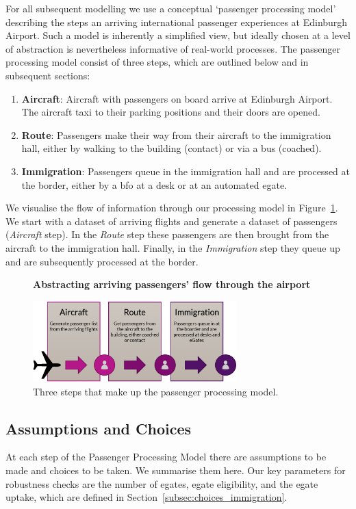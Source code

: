 \documentclass[10pt]{article}
\newcommand*{\figuretitle}[1]{%
    {\centering%
    \textbf{#1}%
    \par\medskip}%
}
\begin{document}
    For all subsequent modelling we use a conceptual `passenger processing model' describing the steps an arriving international passenger experiences at Edinburgh Airport. Such a model is inherently a simplified view, but ideally chosen at a level of abstraction is nevertheless informative of real-world processes. The passenger processing model consist of three steps, which are outlined below and in subsequent sections:
\begin{enumerate}
    \item \textbf{Aircraft}: Aircraft with passengers on board arrive at Edinburgh Airport. The aircraft taxi to their parking positions and their doors are opened. \label{step:aircraft}
    \item \textbf{Route}: Passengers make their way from their aircraft to the immigration hall, either by walking to the building (contact) or via a bus (coached). \label{step:route}
    \item \textbf{Immigration}: Passengers queue in the immigration hall and are processed at the border, either by a \gls{bfo} at a desk or at an automated \gls{egate}. \label{step:immigration}
\end{enumerate}
 We visualise the flow of information through our processing model in Figure~\ref{fig:PPM_threesteps}. We start with a dataset of arriving flights and generate a dataset of passengers (\textit{Aircraft} step). In the \textit{Route} step these passengers are then brought from the aircraft to the immigration hall. Finally, in the \textit{Immigration} step they queue up and are subsequently processed at the border.

\begin{figure}[!ht]
    \centering
    \figuretitle{Abstracting arriving passengers' flow through the airport}
    \includegraphics[width=0.7\textwidth]{figures/ThreeSteps.png}
     \caption{Three steps that make up the passenger processing model.} \label{fig:PPM_threesteps}
\end{figure}

\subsection{Assumptions and Choices}
At each step of the Passenger Processing Model there are assumptions to be made and choices to be taken. We summarise them here. Our key parameters for robustness checks are the number of \glspl{egate}, \gls{egate} eligibility, and the \gls{egate} uptake, which are defined in Section~\ref{subsec:choices_immigration}.
\end{document}
